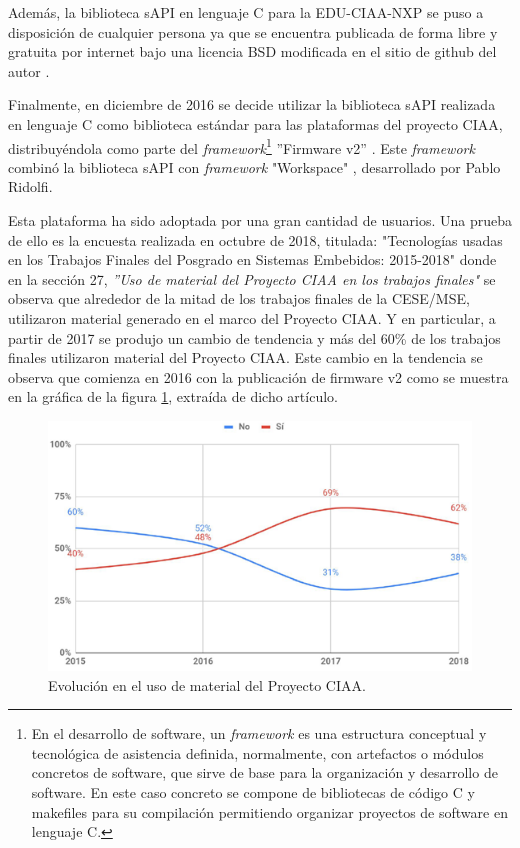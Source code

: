 Además, la biblioteca sAPI en lenguaje C para la EDU-CIAA-NXP se puso a disposición de cualquier persona ya que se encuentra publicada de forma libre y gratuita por internet bajo una licencia BSD modificada \citep{BSD3clause} en el sitio de github del autor \citep{sAPIgit}.

Finalmente, en diciembre de 2016 se decide utilizar la biblioteca sAPI realizada en lenguaje C como biblioteca estándar para las plataformas del proyecto CIAA, distribuyéndola como parte del \emph{framework}\footnote{En el desarrollo de software, un \emph{framework} es una estructura conceptual y tecnológica de asistencia definida, normalmente, con artefactos o módulos concretos de software, que sirve de base para la organización y desarrollo de software. En este caso concreto se compone de bibliotecas de código C y makefiles para su compilación permitiendo organizar proyectos de software en lenguaje C.} ''Firmware v2'' \citep{ciaaFirmwareV2}. Este \emph{framework} combinó la biblioteca sAPI con \emph{framework} "Workspace" \citep{ws-ridolfi}, desarrollado por Pablo Ridolfi.

Esta plataforma ha sido adoptada por una gran cantidad de usuarios. Una prueba de ello es la encuesta realizada en octubre de 2018, titulada: "Tecnologías usadas en los Trabajos Finales del Posgrado en Sistemas Embebidos: 2015-2018" \citep{EncuestaCeseMse} donde en la sección 27, \emph{''Uso de material del Proyecto CIAA en los trabajos finales"} se observa que alrededor de la mitad de los trabajos finales de la CESE/MSE, utilizaron material generado en el marco del Proyecto CIAA. Y en particular, a partir de 2017 se produjo un cambio de tendencia y más del 60\% de los trabajos finales utilizaron material del Proyecto CIAA. Este cambio en la tendencia se observa que comienza en 2016 con la publicación de firmware v2 como se muestra en la gráfica de la figura \ref{fig:tendenciaMaterialCiaa}, extraída de dicho artículo.

\begin{figure}[!htbp]
\begin{center}  %
\includegraphics*[width=12cm]{Figures/TendenciaMaterialCiaa.png}
\par\caption{Evolución en el uso de material del Proyecto CIAA.}\label{fig:tendenciaMaterialCiaa}
\end{center}
\end{figure}

